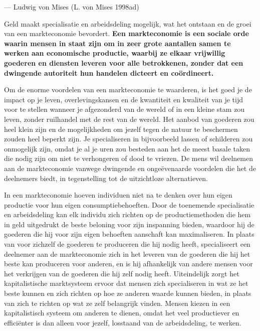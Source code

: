 \documentclass[
  a5paper,
  smalldemyvopaper,11pt,twoside,onecolumn,openright,extrafontsizes,
hidelinks]{memoir}
\begin{document}
--- Ludwig von Mises (L. von Mises 1998ad)

Geld maakt specialisatie en arbeidsdeling mogelijk, wat het ontstaan en
de groei van een markteconomie bevordert. \textbf{Een markteconomie is
een sociale orde waarin mensen in staat zijn om in zeer grote aantallen
samen te werken aan economische productie, waarbij ze elkaar vrijwillig
goederen en diensten leveren voor alle betrokkenen, zonder dat een
dwingende autoriteit hun handelen dicteert en coördineert.}

Om de enorme voordelen van een markteconomie te waarderen, is het goed
je de impact op je leven, overlevingskansen en de kwantiteit en
kwaliteit van je tijd voor te stellen wanneer je afgezonderd van de
wereld of in een kleine stam zou leven, zonder ruilhandel met de rest
van de wereld. Het aanbod van goederen zou heel klein zijn en de
mogelijkheden om jezelf tegen de natuur te beschermen zouden heel
beperkt zijn. Je specialiseren in bijvoorbeeld lassen of schilderen zou
onmogelijk zijn, omdat je al je uren zou besteden aan het de meest
basale taken die nodig zijn om niet te verhongeren of dood te vriezen.
De mens wil deelnemen aan de markteconomie vanwege dwingende en
ongeëvenaarde voordelen die het de deelnemers biedt, in tegenstelling
tot de uitzichtloze alternatieven.

In een markteconomie hoeven individuen niet na te denken over hun eigen
productie voor hun eigen consumptiebehoeften. Door de toenemende
specialisatie en arbeidsdeling kan elk individu zich richten op de
productiemethoden die hem in geld uitgedrukt de beste beloning voor zijn
inspanning bieden, waardoor hij de goederen die hij voor zijn eigen
behoeften aanschaft kan maximaliseren. In plaats van voor zichzelf de
goederen te produceren die hij nodig heeft, specialiseert een deelnemer
aan de markteconomie zich in het leveren van de goederen die hij het
beste kan produceren voor anderen, en is hij afhankelijk van andere
mensen voor het verkrijgen van de goederen die hij zelf nodig heeft.
Uiteindelijk zorgt het kapitalistische marktsysteem ervoor dat mensen
zich specialiseren in wat ze het beste kunnen en zich richten op hoe ze
anderen waarde kunnen bieden, in plaats van zich te richten op wat ze
zelf belangrijk vinden. Mensen kiezen in een kapitalistisch systeem om
anderen te dienen, omdat het veel productiever en efficiënter is dan
alleen voor jezelf, losstaand van de arbeidsdeling, te werken.
\end{document}
